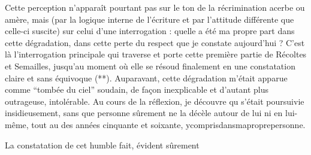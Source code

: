 Cette perception n'apparaît pourtant pas sur le ton de la récrimination acerbe ou amère, mais (par la logique interne de l'écriture et par l'attitude différente que celle-ci suscite) sur celui d'une i\enspace n\enspace t\enspace e\enspace r\enspace r\enspace o\enspace g\enspace a\enspace t\enspace i\enspace o\enspace n : quelle a été ma propre part dans cette dégradation, dans cette perte du respect que je constate aujourd'hui ? C'est là l'interrogation principale qui traverse et porte cette première partie de\margin{\unsure{(!)}} Récoltes et Semailles, jusqu'au moment où elle se résoud finalement en une constatation claire et sans équivoque (**). Auparavant, cette dégradation m'était apparue comme ``tombée du ciel'' soudain, de façon inexplicable et d'autant plus outrageuse, intolérable. Au cours de la réflexion, je découvre qu   s'était  poursuivie insidieusement, sans que personne sûrement ne la décèle autour de lui ni en lui-même, tout au  des années cinquante et soixante, y\quad c\enspace o\enspace m\enspace p\enspace r\enspace i\enspace s\quad d\enspace a\enspace n\enspace s\quad m\enspace a\quad p\enspace r\enspace o\enspace p\enspace r\enspace e\quad p\enspace e\enspace r\enspace s\enspace o\enspace n\enspace n\enspace e.

 La constatation de cet humble fait, évident sûrement
